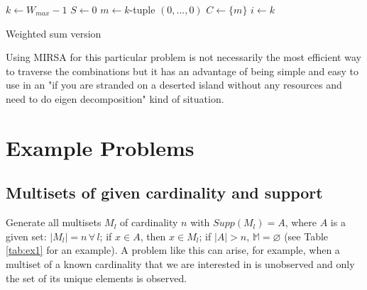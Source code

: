 \documentclass[12pt]{article}
\begin{document}
\begin{algorithm}[H]
  
  \BlankLine
  $k \gets W_{max} - 1$\;
  $S \gets 0$\;
  $m \gets k$-tuple $(0, ..., 0)$\;  
  $C \gets \{m\}$\;
  $i \gets k$\;
  \caption{Weighted sum version}
\end{algorithm}  

\vspace{5mm}
Using MIRSA for this particular problem is not necessarily the most efficient way to traverse the combinations but it has an advantage of being simple and easy to use in an "if you are stranded on a deserted island without any resources and need to do eigen decomposition" kind of situation. 

\section{Example Problems}


\subsection{Multisets of given cardinality and support}

Generate all multisets $M_l$ of cardinality $n$ with $Supp(M_l) = A$, where $A$ is a given set: $|M_l| = n \, \forall \, l$; if $x \in A$, then $x \in M_l$; if $|A| > n$, $\mathbb{M} = \varnothing$ (see Table \ref{tab:ex1} for an example). A problem like this can arise, for example, when a multiset of a known cardinality that we are interested in is unobserved and only the set of its unique elements is observed. \\
\end{document}
